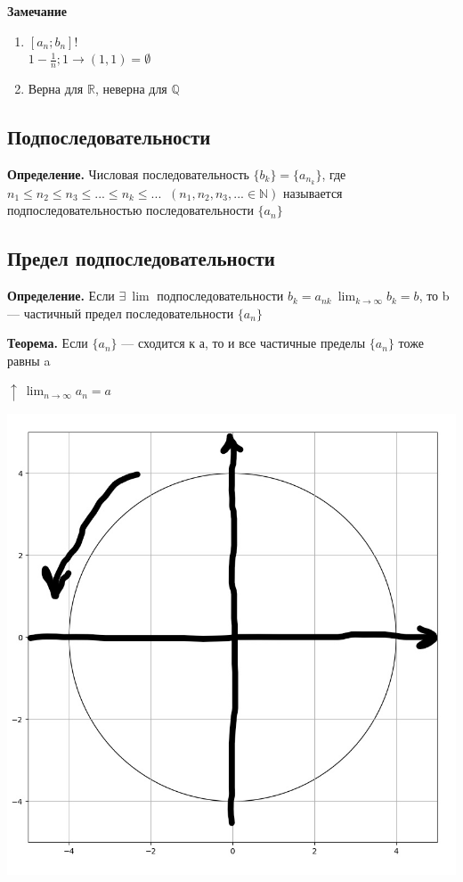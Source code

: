 \documentclass{article}
\begin{document}
    \textbf{Замечание}
	\begin{enumerate}
    	\item \( [a_n; b_n]! \)\\
    	\( 1 - \frac{1}{n}; 1 \rightarrow (1, 1) = \emptyset \)
    	\item Верна для \(\mathbb{R}\), неверна для \(\mathbb{Q}\)
    \end{enumerate}
    
    \subsection{Подпоследовательности}
    
    \textbf{Определение.} Числовая последовательность $\{b_k\} = \{a_{n_k}\}$, где \( n_1 \leq n_2 \leq n_3 \leq ... \leq n_k \leq ...\) $\ (n_1,n_2,n_3,... \in \mathbb{N})$  называется подпоследовательностью последовательности $\{ a_n \}$

    \subsection{Предел подпоследовательности}
    
    \textbf{Определение.} Если \(\exists\ \lim\) подпоследовательности \(b_k = a_{nk}\ \lim_{k \rightarrow \infty}{b_k} = b\), то b --- частичный предел последовательности \(\{a_n\}\)

    \textbf{Теорема.} Если \(\{a_n\}\) --- сходится к а, то и все частичные пределы \(\{a_n\}\) тоже равны a

    \(\uparrow\ \lim_{n \rightarrow \infty}{a_n} = a\)

    \begin{center}
        \includegraphics[scale=0.25]{9}
    \end{center}
        
\end{document}
